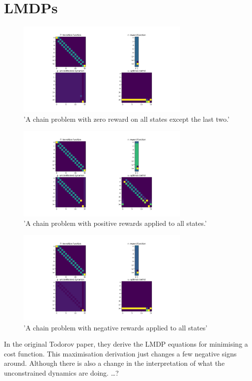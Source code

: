 \chapter{LMDPs}

\begin{figure}
\centering
\includegraphics[width=0.75\textwidth,height=0.5\textheight]{../../pictures/figures/chain-test-zero-rewards.png}
\caption{'A chain problem with zero reward on all states except the last two.'}
\end{figure}

\begin{figure}
\centering
\includegraphics[width=0.75\textwidth,height=0.5\textheight]{../../pictures/figures/chain-test-pos-rewards.png}
\caption{'A chain problem with positive rewards applied to all states.'}
\end{figure}

\begin{figure}
\centering
\includegraphics[width=0.75\textwidth,height=0.5\textheight]{../../pictures/figures/chain-test-neg-rewards.png}
\caption{'A chain problem with negative rewards applied to all states'}
\end{figure}


In the original Todorov paper, they derive the LMDP equations for
minimising a cost function. This maximisation derivation just changes a
few negative signs around. Although there is also a change in the
interpretation of what the unconstrained dynamics are doing. \ldots{}?

